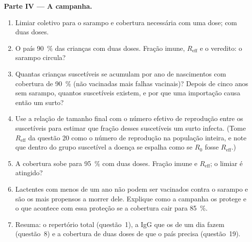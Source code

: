 \begin{problem}
\medskip
\noindent\textbf{Parte IV --- A campanha.}
\begin{enumerate}[resume]
  \item Limiar coletivo para o sarampo e cobertura necessária com uma
        dose; com duas doses.
  \item O país  \qty{90}{\%} das crianças com duas doses. Fração
        imune, $R_{\text{eff}}$ e o veredito: o sarampo circula?
  \item Quantas crianças suscetíveis se acumulam por ano de nascimentos
        com cobertura de \qty{90}{\%} (não vacinadas mais falhas
        vacinais)? Depois de cinco anos sem sarampo, quantos suscetíveis
        existem, e por que uma importação causa então um surto?
  \item Use a relação de tamanho final com o número efetivo de
        reprodução entre os suscetíveis para estimar que fração desses
        suscetíveis um surto infecta. (Tome $R_{\text{eff}}$ da questão
        20 como o número de reprodução na população inteira, e note que
        dentro do grupo suscetível a doença se espalha como se $R_{0}$
        fosse $R_{\text{eff}}$.)
  \item A cobertura sobe para \qty{95}{\%} com duas doses. Fração imune
        e $R_{\text{eff}}$; o limiar é atingido?
  \item Lactentes com menos de um ano não podem ser vacinados contra o
        sarampo e são os mais propensos a morrer dele. Explique como a
        campanha os protege e o que acontece com essa proteção se a
        cobertura cair para \qty{85}{\%}.
  \item Resuma: o repertório total (questão~1), a IgG que os
         de um dia fazem (questão~8) e a cobertura de duas
        doses de que o país precisa (questão~19).
\end{enumerate}
\end{problem}
